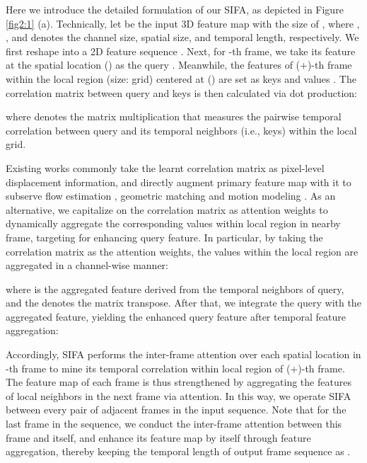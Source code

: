 \documentclass[10pt,twocolumn,letterpaper]{article}
\begin{document}
Here we introduce the detailed formulation of our SIFA, as depicted in Figure \ref{fig2:1} (a).
Technically, let  be the input 3D feature map with the size of , where , , and  denotes the channel size, spatial size, and temporal length, respectively. We first reshape  into a 2D feature sequence . Next, for -th frame, we take its feature at the spatial location () as the query . Meanwhile, the features of (+)-th frame within the local region (size:  grid) centered at () are set as keys  and values . The correlation matrix  between query  and keys  is then calculated via dot production:

where  denotes the matrix multiplication that measures the pairwise temporal correlation between query and its temporal neighbors (i.e., keys) within the local  grid.

Existing works commonly take the learnt correlation matrix  as pixel-level displacement information, and directly augment primary feature map with it to subserve flow estimation \cite{Philippe:ICCV13,Fischer:ICCV15}, geometric matching \cite{Rocco:CVPR17} and motion modeling \cite{Wang:CVPR20}. As an alternative, we capitalize on the correlation matrix as attention weights to dynamically aggregate the corresponding values within local region in nearby frame, targeting for enhancing query feature.
In particular, by taking the correlation matrix  as the attention weights, the values  within the local region are aggregated in a channel-wise manner:

where  is the aggregated feature derived from the temporal neighbors of query, and the  denotes the matrix transpose. After that, we integrate the query with the aggregated feature, yielding the enhanced query feature  after temporal feature aggregation:


Accordingly, SIFA performs the inter-frame attention over each spatial location in -th frame to mine its temporal correlation within local region of (+)-th frame. The feature map of each frame is thus strengthened by aggregating the features of local neighbors in the next frame via attention. In this way, we operate SIFA between every pair of adjacent frames in the input sequence. Note that for the last frame in the sequence, we conduct the inter-frame attention between this frame and itself, and enhance its feature map by itself through feature aggregation, thereby keeping the temporal length of output frame sequence as .
\end{document}

